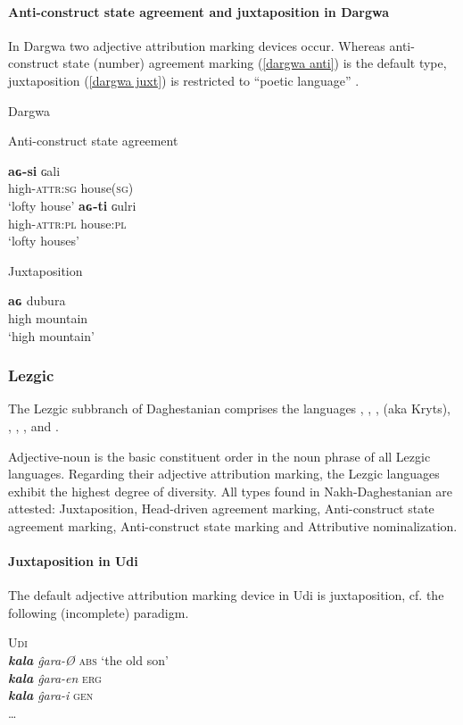 \paragraph{Anti-construct state agreement and juxtaposition in Dargwa} In Dargwa two adjective attribution marking devices occur. Whereas anti-construct state (number) agreement marking (\ref{dargwa anti}) is the default type, juxtaposition (\ref{dargwa juxt}) is restricted to “poetic language” \citep[318]{isaev2004}.
\begin{exe}
\ex 
\rm{Dargwa \citep[318]{isaev2004}}
\begin{xlist}
\ex 
\label{dargwa anti}
\rm{Anti-construct state agreement} 
\begin{xlist}
\ex
\gll	\textbf{aɢ-si} ɢali\\
	high-\textsc{attr:sg} house(\textsc{sg})\\
\glt	‘lofty house’
\ex
\gll	\textbf{aɢ-ti} ɢulri\\
	high-\textsc{attr:pl} house:\textsc{pl}\\
\glt	‘lofty houses’
\end{xlist}

\ex
\label{dargwa juxt}
\rm{Juxtaposition}
\begin{xlist}
\ex
\gll	\textbf{aɢ} dubura\\
	high mountain\\
\glt	‘high mountain’
\end{xlist}
\end{xlist}
\end{exe}

\subsubsection{Lezgic}\label{lezgian synchr}
The Lezgic subbranch of Daghestanian comprises the languages , , ,  (aka Kryts), , , ,  and .

Adjective-noun is the basic constituent order in the noun phrase of all Lezgic languages. Regarding their adjective attribution marking, the Lezgic languages exhibit the highest degree of diversity. All types found in Nakh-Daghestanian are attested: Juxtaposition, Head-driven agreement marking, Anti-construct state agreement marking, Anti-construct state marking and Attributive nominalization.

\paragraph{Juxtaposition in Udi}
The default adjective attribution marking device in Udi is juxtaposition, cf. the following (incomplete) paradigm.
\begin{exe}
\ex \textsc{Udi} \citep[465]{schulze-furhoff1994}\\
\textit{\textbf{kala} ĝara-Ø} \textsc{abs} ‘the old son’\\
\textit{\textbf{kala} ĝara-en} \textsc{erg}\\
\textit{\textbf{kala} ĝara-i} \textsc{gen}\\
\dots
\end{exe}

